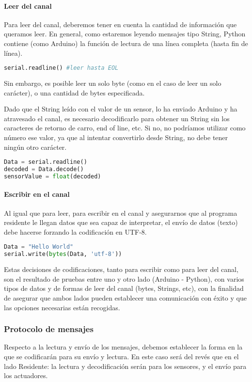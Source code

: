 \paragraph {Leer del canal} 
Para leer del canal, deberemos tener en cuenta la cantidad de información que queramos leer. En general, como estaremos leyendo mensajes tipo String, Python contiene (como Arduino) la función de lectura de una línea completa (hasta fin de línea). 
\begin{lstlisting}[language=python]
serial.readline() #leer hasta EOL		
\end{lstlisting}
Sin embargo, es posible leer un solo byte (como en el caso de leer un solo carácter), o una cantidad de bytes especificada.

Dado que el String leído con el valor de un sensor, lo ha enviado Arduino y ha atravesado el canal, es necesario decodificarlo para obtener un String sin los caracteres de retorno de carro, end of line, etc. Si no, no podríamos utilizar como número ese valor, ya que al intentar convertirlo desde String, no debe tener ningún otro carácter.
\begin{lstlisting}[language=python]	
Data = serial.readline()
decoded = Data.decode()
sensorValue = float(decoded)
\end{lstlisting}
	
	
\paragraph {Escribir en el canal} Al igual que para leer, para escribir en el canal y asegurarnos que al programa residente le llegan datos que sea capaz de interpretar, el envío de datos (texto) debe hacerse forzando la codificación en UTF-8.
\begin{lstlisting}[language=python]
Data = "Hello World"
serial.write(bytes(Data, 'utf-8'))
\end{lstlisting}

Estas decisiones de codificaciones, tanto para escribir como para leer del canal, son el resultado de pruebas entre uno y otro lado (Arduino - Python), con varios tipos de datos y de formas de leer del canal (bytes, Strings, etc), con la finalidad de asegurar que ambos lados pueden establecer una comunicación con éxito y que las opciones necesarias están recogidas.

\subsubsection{Protocolo de mensajes}\label{subsubsec:mensajesPython}
Respecto a la lectura y envío de los mensajes, debemos establecer la forma en la que se codificarán para su envío y lectura. En este caso será del revés que en el lado Residente: la lectura y decodificación serán para los sensores, y el envío para los actuadores. 

